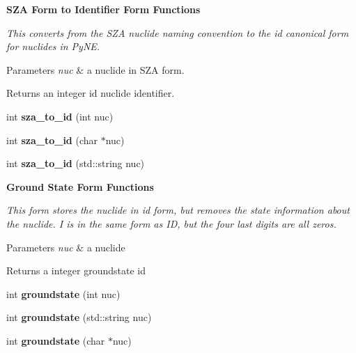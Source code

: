 \begin{Indent}{\bf S\+Z\+A Form to Identifier Form Functions}\par
{\em This converts from the S\+Z\+A nuclide naming convention to the id canonical form for nuclides in Py\+N\+E. 
\begin{DoxyParams}{Parameters}
{\em nuc} & a nuclide in S\+Z\+A form. \\
\hline
\end{DoxyParams}
\begin{DoxyReturn}{Returns}
an integer id nuclide identifier. 
\end{DoxyReturn}
}\begin{DoxyCompactItemize}
\item 
\hypertarget{namespacepyne_1_1nucname_a2d97b24683f8a35a3ab716807fbfccbc}{int {\bfseries sza\+\_\+to\+\_\+id} (int nuc)}\label{namespacepyne_1_1nucname_a2d97b24683f8a35a3ab716807fbfccbc}

\item 
\hypertarget{namespacepyne_1_1nucname_a6e1172966c9e7fd48fc9d5134a674890}{int {\bfseries sza\+\_\+to\+\_\+id} (char $\ast$nuc)}\label{namespacepyne_1_1nucname_a6e1172966c9e7fd48fc9d5134a674890}

\item 
\hypertarget{namespacepyne_1_1nucname_af4d6093c95bb523de10c8c6bb93224aa}{int {\bfseries sza\+\_\+to\+\_\+id} (std\+::string nuc)}\label{namespacepyne_1_1nucname_af4d6093c95bb523de10c8c6bb93224aa}

\end{DoxyCompactItemize}
\end{Indent}
\begin{Indent}{\bf Ground State Form Functions}\par
{\em This form stores the nuclide in id form, but removes the state information about the nuclide. I is in the same form as I\+D, but the four last digits are all zeros. 
\begin{DoxyParams}{Parameters}
{\em nuc} & a nuclide \\
\hline
\end{DoxyParams}
\begin{DoxyReturn}{Returns}
a integer groundstate id 
\end{DoxyReturn}
}\begin{DoxyCompactItemize}
\item 
\hypertarget{namespacepyne_1_1nucname_a81937700730c53c357f2902b9f7efa15}{int {\bfseries groundstate} (int nuc)}\label{namespacepyne_1_1nucname_a81937700730c53c357f2902b9f7efa15}

\item 
\hypertarget{namespacepyne_1_1nucname_a1cc9dcbea2e73a8ffffed55fecff9766}{int {\bfseries groundstate} (std\+::string nuc)}\label{namespacepyne_1_1nucname_a1cc9dcbea2e73a8ffffed55fecff9766}

\item 
\hypertarget{namespacepyne_1_1nucname_a363ed4d7a830a42161630743650a0d39}{int {\bfseries groundstate} (char $\ast$nuc)}\label{namespacepyne_1_1nucname_a363ed4d7a830a42161630743650a0d39}

\end{DoxyCompactItemize}
\end{Indent}
